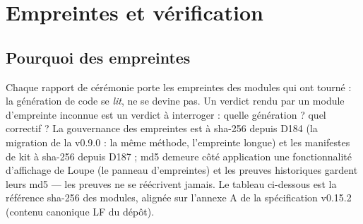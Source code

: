 \section{Empreintes et vérification}\label{sec:empreintslivre}

\subsection{Pourquoi des empreintes}

Chaque rapport de cérémonie porte les empreintes des modules qui ont tourné : la
génération de code se \emph{lit}, ne se devine pas. Un verdict rendu par un module
d'empreinte inconnue est un verdict à interroger : quelle génération ? quel correctif
? La gouvernance des empreintes est à sha-256 depuis D184 (la migration de la
v0.9.0 : la même méthode, l'empreinte longue) et les manifestes de kit à sha-256
depuis D187 ; md5 demeure côté application une fonctionnalité d'affichage de
Loupe (le panneau d'empreintes) et les preuves historiques gardent leurs md5 —
les preuves ne se réécrivent jamais. Le tableau ci-dessous est la référence
sha-256 des modules, alignée sur l'annexe A de la spécification v0.15.2
(contenu canonique LF du dépôt).


